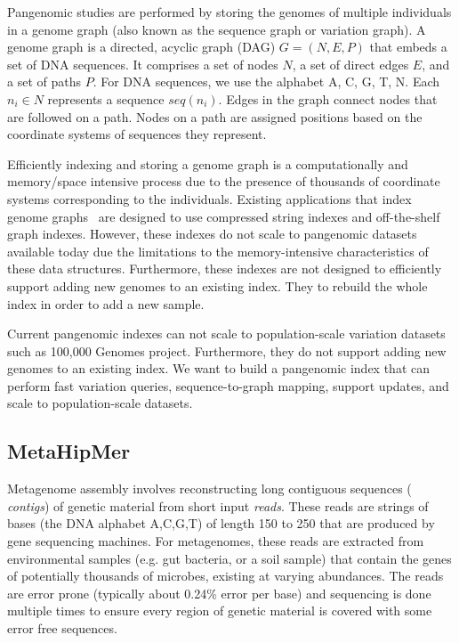 Pangenomic studies are performed by storing the genomes of multiple individuals in a genome graph (also known as the sequence graph or variation graph). A genome graph is a directed, acyclic graph (DAG) $G = (N, E, P)$ that embeds a set of DNA sequences. It comprises a set of
nodes $N$, a set of direct edges $E$, and a set of paths $P$. For DNA sequences, we use the
alphabet {A, C, G, T, N}. Each $n_i \in N$ represents a sequence $seq(n_i)$. Edges in the graph connect nodes that are followed on a path. Nodes on a path
are assigned positions based on the coordinate systems of sequences they represent.

Efficiently indexing and storing a genome graph is a computationally and memory/space intensive process due to the presence of thousands of coordinate systems corresponding to the individuals. Existing applications that index genome graphs~\cite{pandey2021variantstore,garrison2018variation} are designed to use compressed string indexes and off-the-shelf graph indexes. However, these indexes do not scale to pangenomic datasets available today due the limitations to the memory-intensive characteristics of these data structures. Furthermore, these indexes are not designed to efficiently support adding new genomes to an existing index. They to rebuild the whole index in order to add a new sample.



\begin{rproblem}
Current pangenomic indexes can not scale to population-scale variation datasets such as 100,000 Genomes project. Furthermore, they do not support adding new genomes to an existing index. We want to build a pangenomic index that can perform fast variation queries, sequence-to-graph mapping, support updates, and scale to population-scale datasets.
\label{rprob:peppermint}
\end{rproblem}

\subsection{MetaHipMer}

Metagenome assembly involves reconstructing long contiguous sequences ({\it
contigs}) of genetic material from short input {\it reads}. These reads are
strings of bases (the DNA alphabet A,C,G,T) of length 150 to 250 that are
produced by gene sequencing machines.  For metagenomes, these reads are
extracted from environmental samples (e.g. gut bacteria, or a soil sample) that
contain the genes of potentially thousands of microbes, existing at varying
abundances.  The reads are error prone (typically about 0.24\% error per base)
and sequencing is done multiple times to ensure every region of genetic material
is covered with some error free sequences.

